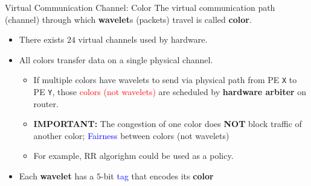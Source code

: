 \documentclass[dvipdfmx, 11pt, aspectratio=169]{beamer}   %
\begin{document}
\begin{frame}{Virtual Communication Channel: Color}
The virtual communication path (channel) through which \textbf{wavelet}s (packets) travel is called \textbf{color}.
\begin{itemize}
    \item There exists $24$ virtual channels used by hardware.
    \item All colors transfer data on a single physical channel.
    \begin{itemize}
        \item If multiple colors have wavelets to send via physical path from PE \texttt{X} to PE \texttt{Y}, those \textcolor{red}{colors (not wavelets)} are scheduled by \textbf{hardware arbiter} on router.
        \item \textbf{IMPORTANT:} The congestion of one color does \textbf{NOT} block traffic of another color; \textcolor{blue}{Fairness} between colors (not wavelets)
        \item For example, RR algorighm could be used as a policy.
    \end{itemize}
    \item Each \textbf{wavelet} has a $5$-bit \textcolor{blue}{tag} that encodes its \textbf{color}
\end{itemize}
\end{frame}
\end{document}
